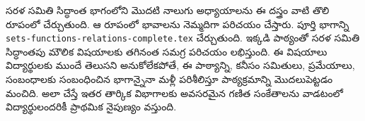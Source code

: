 \documentclass[../../include/open-logic-part]{subfiles}
\begin{document}

\begin{editorial}
  సరళ సమితి సిద్ధాంత భాగంలోని మొదటి నాలుగు అధ్యాయాలను ఈ దస్త్రం వాటి తొలి రూపంలో చేర్చుతుంది. ఆ రూపంలో భావాలను నెమ్మదిగా పరిచయం చేస్తారు. పూర్తి భాగాన్ని \verb|sets-functions-relations-complete.tex| చేర్చుతుంది. ఇక్కడి పాఠ్యంతో సరళ సమితి సిద్ధాంతపు మౌలిక విషయాలకు తగినంత సమగ్ర పరిచయం లభిస్తుంది. ఈ విషయాలు విద్యార్థులకు ముందే తెలుసని అనుకోలేకపోతే, ఈ పాఠ్యాన్ని, కనీసం సమితులు, ప్రమేయాలు, సంబంధాలకు సంబంధించిన భాగాన్నైనా మళ్లీ పరిశీలిస్తూ పాఠ్యక్రమాన్ని మొదలుపెట్టడం మంచిది. అలా చేస్తే ఇతర తార్కిక విభాగాలకు అవసరమైన గణిత సంకేతాలను వాడటంలో విద్యార్థులందరికీ ప్రాథమిక నైపుణ్యం వస్తుంది.
\end{editorial}





\OLEndPartHook
\end{document}

